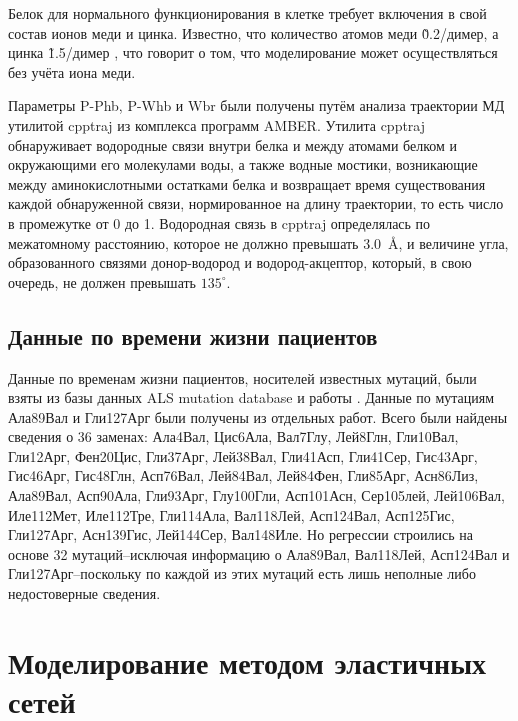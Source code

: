 Белок для нормального функционирования в клетке требует включения в свой состав ионов меди и цинка. Известно, что количество атомов меди \~0.2/димер, а цинка \~1.5/димер \cite{Ayers2014}, что говорит о том, что моделирование может осуществляться без учёта иона меди. 

Параметры P-Phb, P-Whb и Wbr были получены путём анализа траектории МД утилитой cpptraj из комплекса программ AMBER. Утилита cpptraj обнаруживает водородные связи внутри белка и между атомами белком и окружающими его молекулами воды, а также водные мостики, возникающие между аминокислотными остатками белка и возвращает время существования каждой обнаруженной связи, нормированное на длину траектории, то есть число в промежутке от 0 до 1.  Водородная связь в cpptraj определялась по межатомному расстоянию, которое не должно превышать 3.0~\AA, и величине угла, образованного связями донор-водород и водород-акцептор, который, в свою очередь, не должен превышать $135^\circ$.

\subsection{Данные по времени жизни пациентов} \label{subsect_MD_survival_data}

Данные по временам жизни пациентов, носителей известных мутаций, были взяты из базы данных ALS mutation database \cite{Yoshida2010} и работы \cite{Wang2008}. Данные по мутациям Ала89Вал \cite{Sato2005} и Гли127Арг \cite{Holmoy2010} были получены из отдельных работ. Всего были найдены сведения о 36 заменах: Ала4Вал, Цис6Ала, Вал7Глу, Лей8Глн, Гли10Вал, Гли12Арг, Фен20Цис, Гли37Арг, Лей38Вал, Гли41Асп, Гли41Сер, Гис43Арг, Гис46Арг, Гис48Глн, Асп76Вал, Лей84Вал, Лей84Фен, Гли85Арг, Асн86Лиз, Ала89Вал, Асп90Ала, Гли93Арг, Глу100Гли, Асп101Асн, Сер105лей, Лей106Вал, Иле112Мет, Иле112Тре, Гли114Ала, Вал118Лей, Асп124Вал, Асп125Гис, Гли127Арг, Асн139Гис, Лей144Сер, Вал148Иле. Но регрессии строились на основе 32 мутаций--исключая информацию о Ала89Вал, Вал118Лей, Асп124Вал и Гли127Арг--поскольку по каждой из этих мутаций есть лишь неполные либо недостоверные сведения.

\section{Моделирование методом эластичных сетей} \label{sect_EN}

